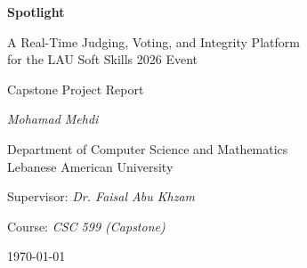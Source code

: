 \documentclass[11pt,a4paper]{article}
\begin{document}
\begin{titlepage}
  \centering
  \vspace*{2cm}
  {\LARGE\bfseries Spotlight\par}
  \vspace{0.6cm}
  {\Large A Real-Time Judging, Voting, and Integrity Platform\\[0.2cm]
  for the LAU Soft Skills 2026 Event\par}
  \vspace{2.2cm}
  {\large Capstone Project Report\par}
  \vspace{1.0cm}
  {\large\textit{Mohamad Mehdi}\par}
  \vspace{0.3cm}
  {\normalsize Department of Computer Science and Mathematics \\
  Lebanese American University \par}
  \vspace{2.5cm}
  {\normalsize Supervisor: \textit{Dr. Faisal Abu Khzam}\par}
  \vspace{0.4cm}
  {\normalsize Course: \textit{CSC 599 (Capstone)}\par}
  \vfill
  {\normalsize \today\par}
\end{titlepage}



\clearpage

\tableofcontents
\clearpage
\listoffigures
\listoftables
\clearpage
















\appendix


\end{document}
